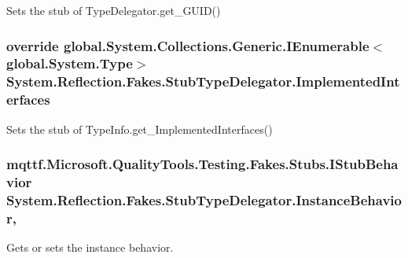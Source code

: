 Sets the stub of Type\-Delegator.\-get\-\_\-\-G\-U\-I\-D()

\hypertarget{class_system_1_1_reflection_1_1_fakes_1_1_stub_type_delegator_ac0dd268853b16cc9bed6ecced0a59b19}{
\subsubsection[{Implemented\-Interfaces}]{\setlength{\rightskip}{0pt plus 5cm}override global.\-System.\-Collections.\-Generic.\-I\-Enumerable$<$global.\-System.\-Type$>$ System.\-Reflection.\-Fakes.\-Stub\-Type\-Delegator.\-Implemented\-Interfaces\hspace{0.3cm}{\ttfamily [get]}}}\label{class_system_1_1_reflection_1_1_fakes_1_1_stub_type_delegator_ac0dd268853b16cc9bed6ecced0a59b19}


Sets the stub of Type\-Info.\-get\-\_\-\-Implemented\-Interfaces()

\hypertarget{class_system_1_1_reflection_1_1_fakes_1_1_stub_type_delegator_ae916bb0761cac939fb978db54a1d6859}{
\subsubsection[{Instance\-Behavior}]{\setlength{\rightskip}{0pt plus 5cm}mqttf.\-Microsoft.\-Quality\-Tools.\-Testing.\-Fakes.\-Stubs.\-I\-Stub\-Behavior System.\-Reflection.\-Fakes.\-Stub\-Type\-Delegator.\-Instance\-Behavior\hspace{0.3cm}{\ttfamily [get]}, {\ttfamily [set]}}}\label{class_system_1_1_reflection_1_1_fakes_1_1_stub_type_delegator_ae916bb0761cac939fb978db54a1d6859}


Gets or sets the instance behavior.

